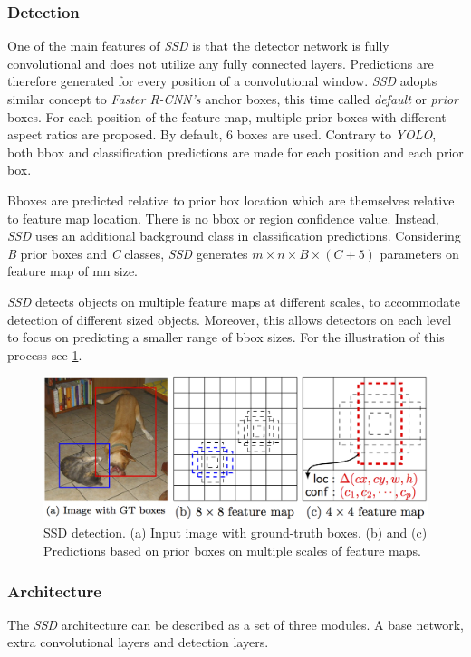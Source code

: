 \subsubsection{Detection}
One of the main features of \textit{SSD} is that the detector network is fully convolutional and does not utilize any fully connected layers. Predictions are therefore generated for every position of a convolutional window. \textit{SSD} adopts similar concept to \textit{Faster R-CNN's} anchor boxes, this time called \textit{default} or \textit{prior} boxes. For each position of the feature map, multiple prior boxes with different aspect ratios are proposed. By default, 6 boxes are used. Contrary to \textit{YOLO}, both bbox and classification predictions are made for each position and each prior box.

Bboxes are predicted relative to prior box location which are themselves relative to feature map location. There is no bbox or region confidence value. Instead, \textit{SSD} uses an additional background class in classification predictions. Considering \textit{B} prior boxes and \textit{C} classes, \textit{SSD} generates $m\times n\times B\times (C+5)$ parameters on feature map of m\x n size.

\textit{SSD} detects objects on multiple feature maps at different scales, to accommodate detection of different sized objects. Moreover, this allows detectors on each level to focus on predicting a smaller range of bbox sizes. For the illustration of this process see \cref{fig:ssddet}.

\begin{figure}
    \centering
    \includegraphics[width=\textwidth]{img/ssddet}
    \caption[SSD detection]%
    {SSD detection. (a) Input image with ground-truth boxes. (b) and (c) Predictions based on prior boxes on multiple scales of feature maps.}
    \label{fig:ssddet}
\end{figure}

\subsubsection{Architecture}
The \textit{SSD} architecture can be described as a set of three modules. A base network, extra convolutional layers and detection layers.


